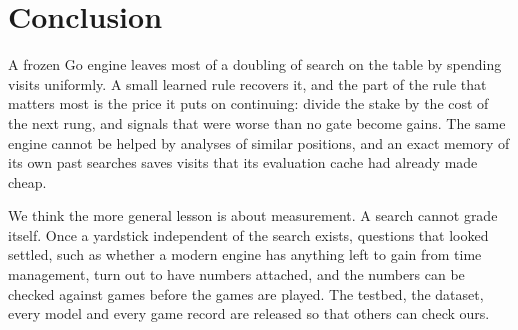 \section{Conclusion}

A frozen Go engine leaves most of a doubling of search on the table by spending visits uniformly. A small learned rule recovers it, and the part of the rule that matters most is the price it puts on continuing: divide the stake by the cost of the next rung, and signals that were worse than no gate become gains. The same engine cannot be helped by analyses of similar positions, and an exact memory of its own past searches saves visits that its evaluation cache had already made cheap.

We think the more general lesson is about measurement. A search cannot grade itself. Once a yardstick independent of the search exists, questions that looked settled, such as whether a modern engine has anything left to gain from time management, turn out to have numbers attached, and the numbers can be checked against games before the games are played. The testbed, the dataset, every model and every game record are released so that others can check ours.
